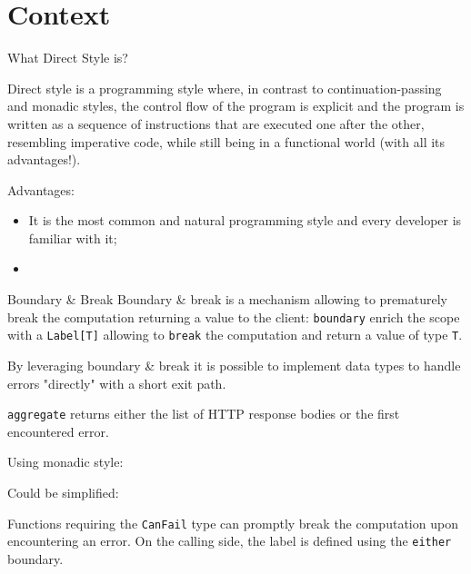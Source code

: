 \documentclass[aspectratio=1610,xcolor=dvipsnames]{beamer}
\begin{document}
\section{Context}
\begin{frame}{What Direct Style is?}
  \begin{block}{}
    Direct style is a programming style where, in contrast to continuation-passing and monadic styles, the control flow of the program is explicit and the program is written as a sequence of instructions that are executed one after the other, resembling imperative code, while still being in a functional world (with all its advantages!).
  \end{block}
  Advantages:
  \begin{itemize}
      \item It is the most common and natural programming style and every developer is familiar with it;
      \item 
  \end{itemize}
\end{frame}
%
\begin{frame}{Boundary \& Break \cite{scalar-gears}}
  Boundary \& break is a mechanism allowing to prematurely break the computation returning a value to the client: \texttt{boundary} enrich the scope with a \texttt{Label[T]} allowing to \texttt{break} the computation and return a value of type \texttt{T}.
  
  By leveraging boundary \& break it is possible to implement data types to handle errors "directly" with a short exit path. 
\end{frame}
%
\begin{frame}
  \footnotesize
  \texttt{aggregate} returns either the list of HTTP response bodies or the first encountered error.

  

  \pause
  Using monadic style:
  

  \pause
  Could be simplified: 
  
\end{frame}
%
\begin{frame}
  \small
  Functions requiring the \texttt{CanFail} type can promptly break the computation upon encountering an error.
  On the calling side, the label is defined using the \texttt{either} boundary.
  
  
\end{frame}
\end{document}
